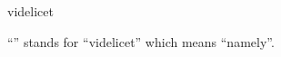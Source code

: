 \documentclass{stex}
\begin{document}
\begin{smodule}{videlicet}
\begin{sparagraph}[style=symdoc]
``'' stands for
``\foreignlanguage{latin}{videlicet}'' which means ``namely''.
\end{sparagraph}
\end{smodule}
\end{document}
